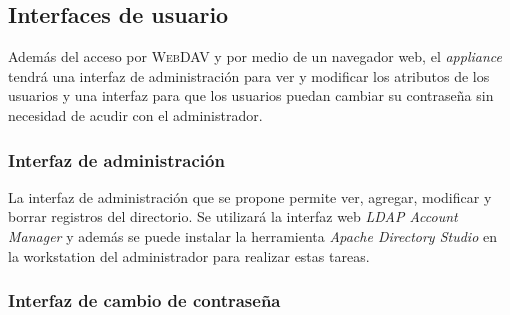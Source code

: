 %
%
%

      \subsection {Interfaces de usuario}

Adem\'{a}s del acceso por \textsc{WebDAV} y por medio de un navegador web, el \textit{appliance} tendr\'{a} una interfaz de administraci\'{o}n para ver y modificar los atributos de los usuarios y una interfaz para que los usuarios puedan cambiar su contrase\~{n}a sin necesidad de acudir con el administrador.

        \subsubsection {Interfaz de administraci\'{o}n}

La interfaz de administraci\'{o}n que se propone permite ver, agregar, modificar y borrar registros del directorio. Se utilizar\'{a} la interfaz web \textit{LDAP Account Manager} y adem\'{a}s se puede instalar la herramienta \textit{Apache Directory Studio} en la workstation del administrador para realizar  estas tareas.

        \subsubsection {Interfaz de cambio de contrase\~{n}a}

